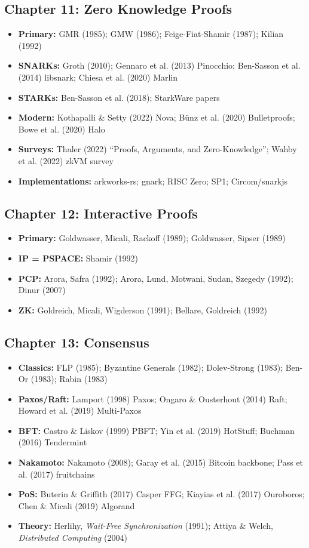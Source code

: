 \subsection{Chapter 11: Zero Knowledge Proofs}
\begin{itemize}
\item \textbf{Primary:} GMR (1985); GMW (1986); Feige-Fiat-Shamir (1987); Kilian (1992)
\item \textbf{SNARKs:} Groth (2010); Gennaro et al. (2013) Pinocchio; Ben-Sasson et al. (2014) libsnark; Chiesa et al. (2020) Marlin
\item \textbf{STARKs:} Ben-Sasson et al. (2018); StarkWare papers
\item \textbf{Modern:} Kothapalli \& Setty (2022) Nova; B\"unz et al. (2020) Bulletproofs; Bowe et al. (2020) Halo
\item \textbf{Surveys:} Thaler (2022) ``Proofs, Arguments, and Zero-Knowledge''; Wahby et al. (2022) zkVM survey
\item \textbf{Implementations:} arkworks-rs; gnark; RISC Zero; SP1; Circom/snarkjs
\end{itemize}

\subsection{Chapter 12: Interactive Proofs}
\begin{itemize}
\item \textbf{Primary:} Goldwasser, Micali, Rackoff (1989); Goldwasser, Sipser (1989)
\item \textbf{IP = PSPACE:} Shamir (1992)
\item \textbf{PCP:} Arora, Safra (1992); Arora, Lund, Motwani, Sudan, Szegedy (1992); Dinur (2007)
\item \textbf{ZK:} Goldreich, Micali, Wigderson (1991); Bellare, Goldreich (1992)
\end{itemize}

\subsection{Chapter 13: Consensus}
\begin{itemize}
\item \textbf{Classics:} FLP (1985); Byzantine Generals (1982); Dolev-Strong (1983); Ben-Or (1983); Rabin (1983)
\item \textbf{Paxos/Raft:} Lamport (1998) Paxos; Ongaro \& Ousterhout (2014) Raft; Howard et al. (2019) Multi-Paxos
\item \textbf{BFT:} Castro \& Liskov (1999) PBFT; Yin et al. (2019) HotStuff; Buchman (2016) Tendermint
\item \textbf{Nakamoto:} Nakamoto (2008); Garay et al. (2015) Bitcoin backbone; Pass et al. (2017) fruitchains
\item \textbf{PoS:} Buterin \& Griffith (2017) Casper FFG; Kiayias et al. (2017) Ouroboros; Chen \& Micali (2019) Algorand
\item \textbf{Theory:} Herlihy, \emph{Wait-Free Synchronization} (1991); Attiya \& Welch, \emph{Distributed Computing} (2004)
\end{itemize}

